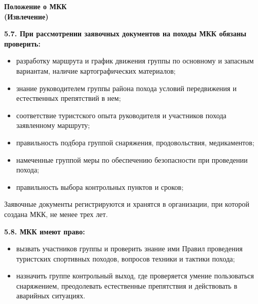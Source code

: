 \documentclass[a5paper, 12pt, twoside]{article}
\begin{document}
\newpage %

    \strut

\newpage %

    {\centering%
    \textbf{Положение о МКК\\
    (Извлечение)}\par}
    \vspace{1cm}

    \textbf{5.7. При рассмотрении заявочных документов на походы МКК обязаны
    проверить:}

    \begin{itemize}[itemsep=2pt, leftmargin=1.1cm, label=$\triangleright$]
        \item разработку маршрута и график движения группы по основному и запасным вариантам,
        наличие картографических материалов;
        \item знание руководителем группы района похода условий передвижения и естественных препятствий в нем;
        \item соответствие туристского опыта руководителя и участников похода заявленному маршруту;
        \item правильность подбора группой снаряжения, продовольствия, медикаментов;
        \item намеченные группой меры по обеспечению безопасности при проведении похода;
        \item правильность выбора контрольных пунктов и сроков;
    \end{itemize}

    Заявочные документы регистрируются и хранятся в организации, при которой создана МКК, не менее трех лет.
    \vspace{0.5cm}

    \textbf{5.8. МКК имеют право:}

    \begin{itemize}[itemsep=2pt, leftmargin=1.1cm, label=$\triangleright$]
        \item вызвать участников группы и проверить знание ими Правил проведения туристских
        спортивных походов, вопросов техники и тактики похода;
        \item назначить группе контрольный выход, где проверяется умение пользоваться снаряжением,
        преодолевать естест\-венные препятствия и действовать в аварийных ситуациях.
    \end{itemize}

\newpage %

\strut

\newpage %


\newpage %

\strut

\newpage %

\strut
\end{document}
